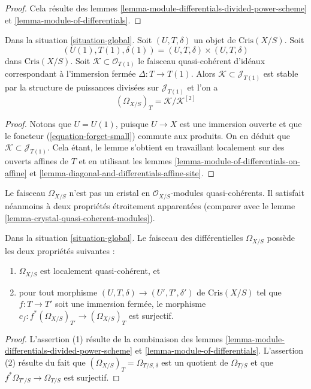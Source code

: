 \begin{proof}
Cela résulte des lemmes \ref{lemma-module-differentials-divided-power-scheme} et
\ref{lemma-module-of-differentials}.
\end{proof}

\begin{lemma}
\label{lemma-describe-omega-small}
Dans la situation \ref{situation-global}.
Soit $(U, T, \delta)$ un objet de $\text{Cris}(X/S)$.
Soit
$$
(U(1), T(1), \delta(1)) = (U, T, \delta) \times (U, T, \delta)
$$
dans $\text{Cris}(X/S)$. Soit $\mathcal{K} \subset \mathcal{O}_{T(1)}$
le faisceau quasi-cohérent d'idéaux correspondant à l'immersion
fermée $\Delta : T \to T(1)$. Alors
$\mathcal{K} \subset \mathcal{J}_{T(1)}$ est stable par la
structure de puissances divisées sur $\mathcal{J}_{T(1)}$ et l'on a
$$
(\Omega_{X/S})_T = \mathcal{K}/\mathcal{K}^{[2]}
$$
\end{lemma}

\begin{proof}
Notons que $U = U(1)$, puisque $U \to X$ est une immersion ouverte et que
le foncteur (\ref{equation-forget-small}) commute aux produits. On en déduit que
$\mathcal{K} \subset \mathcal{J}_{T(1)}$. Cela étant, le lemme s'obtient
en travaillant localement sur des ouverts affines de $T$ et en utilisant les
lemmes \ref{lemma-module-of-differentials-on-affine} et
\ref{lemma-diagonal-and-differentials-affine-site}.
\end{proof}

\noindent
Le faisceau $\Omega_{X/S}$ n'est pas un cristal en
$\mathcal{O}_{X/S}$-modules quasi-cohérents. Il satisfait néanmoins à deux propriétés
étroitement apparentées (comparer avec le
lemme \ref{lemma-crystal-quasi-coherent-modules}).

\begin{lemma}
\label{lemma-omega-locally-quasi-coherent}
Dans la situation \ref{situation-global}.
Le faisceau des différentielles $\Omega_{X/S}$ possède les deux
propriétés suivantes :
\begin{enumerate}
\item $\Omega_{X/S}$ est localement quasi-cohérent, et
\item pour tout morphisme $(U, T, \delta) \to (U', T', \delta')$
de $\text{Cris}(X/S)$ tel que $f : T \to T'$ soit une immersion fermée,
le morphisme $c_f : f^*(\Omega_{X/S})_{T'} \to (\Omega_{X/S})_T$ est surjectif.
\end{enumerate}
\end{lemma}

\begin{proof}
L'assertion (1) résulte de la combinaison des
lemmes \ref{lemma-module-differentials-divided-power-scheme} et
\ref{lemma-module-of-differentials}.
L'assertion (2) résulte du fait que
$(\Omega_{X/S})_T = \Omega_{T/S, \delta}$
est un quotient de $\Omega_{T/S}$ et que $f^*\Omega_{T'/S} \to \Omega_{T/S}$
est surjectif.
\end{proof}







